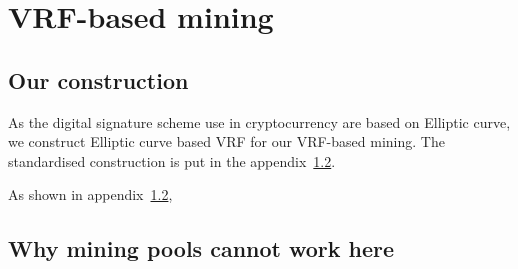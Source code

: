 \section{VRF-based mining}

\subsection{Our construction}

As the digital signature scheme use in cryptocurrency are based on Elliptic curve, we construct Elliptic curve based VRF for our VRF-based mining.
The standardised construction is put in the appendix~\ref{}.



As shown in appendix~\ref{}, 



\subsection{Why mining pools cannot work here}



